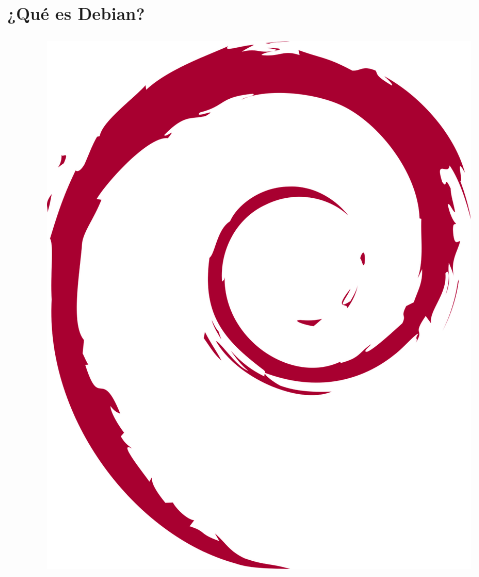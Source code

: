 \documentclass{beamer}
\begin{document}
\begin{frame}
  \frametitle{¿Qué es Debian?}
	\begin{figure}
		\centering
		\includegraphics[width=0.7\linewidth]{images/debian}
		\label{fig:debian}
	\end{figure}
\end{frame}
\end{document}
